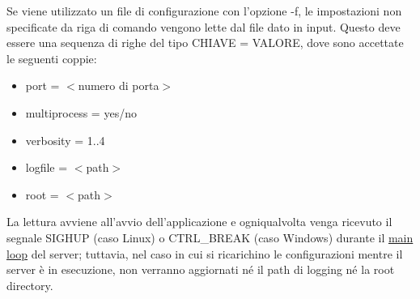 \documentclass{article}
\begin{document}
Se viene utilizzato un file di configurazione con l'opzione -f, le impostazioni non specificate
da riga di comando vengono lette dal file dato in input. Questo deve essere una sequenza di righe del tipo CHIAVE = VALORE, 
dove sono accettate le seguenti coppie:
\begin{itemize}
    \item port = $<$numero di porta$>$
    \item multiprocess = yes/no
    \item verbosity = {1..4}
    \item logfile = $<$path$>$
    \item root = $<$path$>$
\end{itemize}
La lettura avviene all'avvio dell'applicazione e ogniqualvolta venga ricevuto il segnale 
SIGHUP (caso Linux) o CTRL\_BREAK (caso Windows) durante il \href{html/server_8h.html#a533c9a4292e9d1106ff7c54fbf75090a}
{main loop} del server; tuttavia, nel caso in cui si ricarichino le configurazioni mentre il server è in esecuzione,
non verranno aggiornati né il path di logging né la root directory.\\
\end{document}

